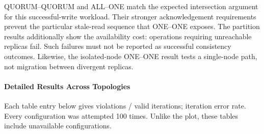 QUORUM--QUORUM and ALL--ONE match the expected intersection argument for this successful-write workload. Their stronger acknowledgement requirements prevent the particular stale-read sequence that ONE--ONE exposes. The partition results additionally show the availability cost: operations requiring unreachable replicas fail. Such failures must not be reported as successful consistency outcomes. Likewise, the isolated-node ONE--ONE result tests a single-node path, not migration between divergent replicas.

\paragraph{Detailed Results Across Topologies}\label{mr:detailed-results-across-topologies}

Each table entry below gives violations / valid iterations; iteration error rate. Every configuration was attempted 100 times. Unlike the plot, these tables include unavailable configurations.

